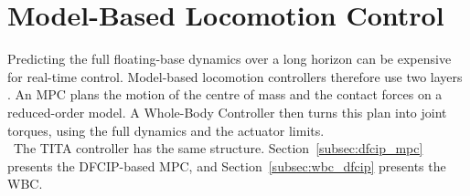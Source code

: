\chapter{Model-Based Locomotion Control}
\label{sec:model_based_control}

Predicting the full floating-base dynamics over a long horizon can be expensive
for real-time control. Model-based locomotion controllers therefore use two
layers \cite{legged_optimization, cheetah_mpc}. An MPC plans the motion of the
centre of mass and the contact forces on a reduced-order model. A Whole-Body
Controller then turns this plan into joint torques, using the full dynamics and
the actuator limits.\\
\
The TITA controller has the same structure.
Section~\ref{subsec:dfcip_mpc} presents the DFCIP-based MPC, and
Section~\ref{subsec:wbc_dfcip} presents the WBC.




\newpage

